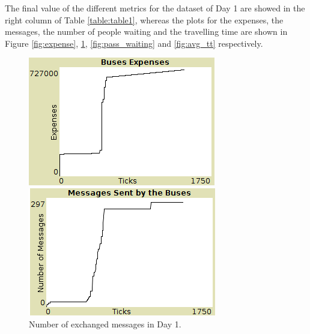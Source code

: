 The final value of the different metrics for the dataset of Day 1 are showed in the right column of Table \ref{table:table1}, whereas the plots for the expenses, the messages, the number of people waiting and the travelling time are shown in Figure \ref{fig:expense}, \ref{fig:messages}, \ref{fig:pass_waiting} and \ref{fig:avg_tt} respectively.

\begin{figure}[htbp]
\centering
\begin{minipage}{.48\textwidth}
  \includegraphics[width=\textwidth]{src/expenses.png}
  \caption{\label{fig:expense}Expenses of the buses in Day 1.}
\end{minipage}%
\begin{minipage}{.48\textwidth}
  \includegraphics[width=\textwidth]{src/nr_messages.png}
  \caption{\label{fig:messages}Number of exchanged messages in Day 1.}
\end{minipage}
\end{figure}

